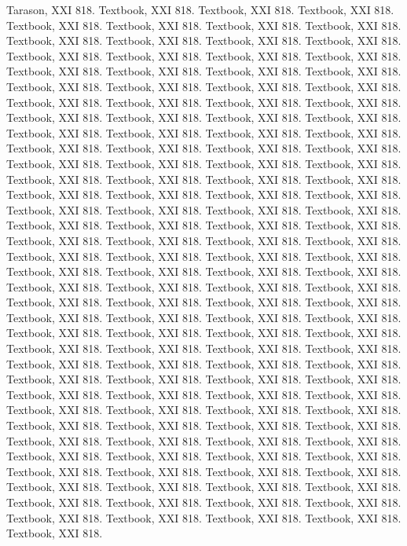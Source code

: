 \documentclass[11pt]{article}
\begin{document}
Tarason, XXI 818.
Textbook, XXI 818.
Textbook, XXI 818.
Textbook, XXI 818.
Textbook, XXI 818.
Textbook, XXI 818.
Textbook, XXI 818.
Textbook, XXI 818.
Textbook, XXI 818.
Textbook, XXI 818.
Textbook, XXI 818.
Textbook, XXI 818.
Textbook, XXI 818.
Textbook, XXI 818.
Textbook, XXI 818.
Textbook, XXI 818.
Textbook, XXI 818.
Textbook, XXI 818.
Textbook, XXI 818.
Textbook, XXI 818.
Textbook, XXI 818.
Textbook, XXI 818.
Textbook, XXI 818.
Textbook, XXI 818.
Textbook, XXI 818.
Textbook, XXI 818.
Textbook, XXI 818.
Textbook, XXI 818.
Textbook, XXI 818.
Textbook, XXI 818.
Textbook, XXI 818.
Textbook, XXI 818.
Textbook, XXI 818.
Textbook, XXI 818.
Textbook, XXI 818.
Textbook, XXI 818.
Textbook, XXI 818.
Textbook, XXI 818.
Textbook, XXI 818.
Textbook, XXI 818.
Textbook, XXI 818.
Textbook, XXI 818.
Textbook, XXI 818.
Textbook, XXI 818.
Textbook, XXI 818.
Textbook, XXI 818.
Textbook, XXI 818.
Textbook, XXI 818.
Textbook, XXI 818.
Textbook, XXI 818.
Textbook, XXI 818.
Textbook, XXI 818.
Textbook, XXI 818.
Textbook, XXI 818.
Textbook, XXI 818.
Textbook, XXI 818.
Textbook, XXI 818.
Textbook, XXI 818.
Textbook, XXI 818.
Textbook, XXI 818.
Textbook, XXI 818.
Textbook, XXI 818.
Textbook, XXI 818.
Textbook, XXI 818.
Textbook, XXI 818.
Textbook, XXI 818.
Textbook, XXI 818.
Textbook, XXI 818.
Textbook, XXI 818.
Textbook, XXI 818.
Textbook, XXI 818.
Textbook, XXI 818.
Textbook, XXI 818.
Textbook, XXI 818.
Textbook, XXI 818.
Textbook, XXI 818.
Textbook, XXI 818.
Textbook, XXI 818.
Textbook, XXI 818.
Textbook, XXI 818.
Textbook, XXI 818.
Textbook, XXI 818.
Textbook, XXI 818.
Textbook, XXI 818.
Textbook, XXI 818.
Textbook, XXI 818.
Textbook, XXI 818.
Textbook, XXI 818.
Textbook, XXI 818.
Textbook, XXI 818.
Textbook, XXI 818.
Textbook, XXI 818.
Textbook, XXI 818.
Textbook, XXI 818.
Textbook, XXI 818.
Textbook, XXI 818.
Textbook, XXI 818.
Textbook, XXI 818.
Textbook, XXI 818.
Textbook, XXI 818.
Textbook, XXI 818.
Textbook, XXI 818.
Textbook, XXI 818.
Textbook, XXI 818.
Textbook, XXI 818.
Textbook, XXI 818.
Textbook, XXI 818.
Textbook, XXI 818.
Textbook, XXI 818.
Textbook, XXI 818.
Textbook, XXI 818.
Textbook, XXI 818.
Textbook, XXI 818.
Textbook, XXI 818.
Textbook, XXI 818.
Textbook, XXI 818.
Textbook, XXI 818.
Textbook, XXI 818.
Textbook, XXI 818.
Textbook, XXI 818.
Textbook, XXI 818.
Textbook, XXI 818.
Textbook, XXI 818.
Textbook, XXI 818.
Textbook, XXI 818.
Textbook, XXI 818.
Textbook, XXI 818.
Textbook, XXI 818.
Textbook, XXI 818.
Textbook, XXI 818.
Textbook, XXI 818.
Textbook, XXI 818.
Textbook, XXI 818.
Textbook, XXI 818.
Textbook, XXI 818.
Textbook, XXI 818.
Textbook, XXI 818.
\end{document}

